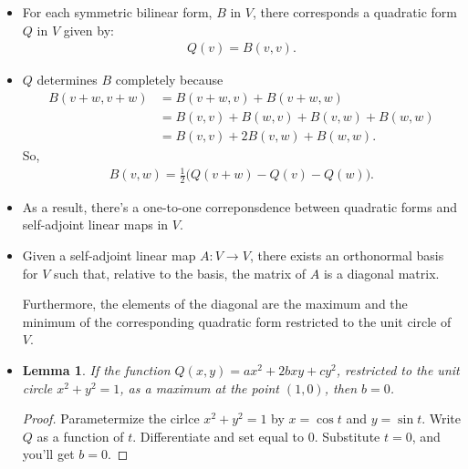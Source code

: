 \documentclass[10pt]{article}
\newtheorem{lemma}{Lemma}[section]
\newcommand{\ra}{\rightarrow}
\begin{document}
\begin{itemize}
    \item For each symmetric bilinear form, $B$ in $V$, there corresponds a quadratic form $Q$ in $V$ given by:
    \begin{align*}
      Q(v) = B(v,v).
    \end{align*}

    \item $Q$ determines $B$ completely because
    \begin{align*}
      B(v + w, v + w) 
      &= B(v+w,v) + B(v+w,w)\\
      &= B(v,v) + B(w,v) + B(v,w) + B(w,w)\\
      &= B(v,v) + 2B(v,w) + B(w,w).
    \end{align*}
    So,
    \begin{align*}
      B(v,w) = \frac{1}{2}\big( Q(v+w) - Q(v) - Q(w) \big).
    \end{align*}

    \item As a result, there's a one-to-one correponsdence between quadratic forms and self-adjoint linear maps in $V$.

    \item Given a self-adjoint linear map $A: V \ra V$, there exists an orthonormal basis for $V$ such that, relative to the basis, the matrix of $A$ is a diagonal matrix.

    Furthermore, the elements of the diagonal are the maximum and the minimum of the corresponding quadratic form restricted to the unit circle of $V$.

    \item \begin{lemma}
      If the function $Q(x,y) = ax^2 + 2bxy + cy^2$, restricted to the unit circle $x^2 + y^2 = 1$, as a maximum at the point $(1,0)$, then $b = 0$.
    \end{lemma}

    \begin{proof}
      Parametermize the cirlce $x^2 + y^2 = 1$ by $x = \cos t$ and $y = \sin t$. Write $Q$ as a function of $t$. Differentiate and set equal to 0. Substitute $t = 0$, and you'll get $b = 0$.
    \end{proof}


\end{itemize}
\end{document}
